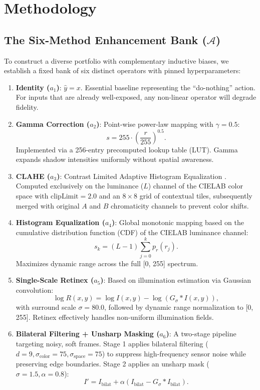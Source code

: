 \documentclass[journal]{IEEEtran}
\begin{document}
\section{Methodology}

\subsection{The Six-Method Enhancement Bank (\texorpdfstring{$\mathcal{A}$}{A})}
To construct a diverse portfolio with complementary inductive biases, we establish a fixed bank of six distinct operators with pinned hyperparameters:

\begin{enumerate}
    \item \textbf{Identity ($a_1$)}: $\hat{y} = x$. Essential baseline representing the ``do-nothing'' action. For inputs that are already well-exposed, any non-linear operator will degrade fidelity.
    \item \textbf{Gamma Correction ($a_2$)}: Point-wise power-law mapping with $\gamma = 0.5$:
    \begin{equation}
    s = 255 \cdot \left(\frac{r}{255}\right)^{0.5}.
    \end{equation}
    Implemented via a 256-entry precomputed lookup table (LUT). Gamma expands shadow intensities uniformly without spatial awareness.
    \item \textbf{CLAHE ($a_3$)}: Contrast Limited Adaptive Histogram Equalization \cite{zuiderveld1994contrast}. Computed exclusively on the luminance ($L$) channel of the CIELAB color space with $\text{clipLimit} = 2.0$ and an $8 \times 8$ grid of contextual tiles, subsequently merged with original $A$ and $B$ chromaticity channels to prevent color shifts.
    \item \textbf{Histogram Equalization ($a_4$)}: Global monotonic mapping based on the cumulative distribution function (CDF) of the CIELAB luminance channel:
    \begin{equation}
    s_k = (L - 1) \sum_{j=0}^k p_r(r_j).
    \end{equation}
    Maximizes dynamic range across the full [0, 255] spectrum.
    \item \textbf{Single-Scale Retinex ($a_5$)}: Based on illumination estimation via Gaussian convolution:
    \begin{equation}
    \log R(x, y) = \log I(x, y) - \log (G_\sigma * I(x, y)),
    \end{equation}
    with surround scale $\sigma = 80.0$, followed by dynamic range normalization to [0, 255]. Retinex effectively handles non-uniform illumination fields.
    \item \textbf{Bilateral Filtering + Unsharp Masking ($a_6$)}: A two-stage pipeline targeting noisy, soft frames. Stage 1 applies bilateral filtering ($d=9, \sigma_{\text{color}}=75, \sigma_{\text{space}}=75$) to suppress high-frequency sensor noise while preserving edge boundaries. Stage 2 applies an unsharp mask ($\sigma=1.5, \alpha=0.8$):
    \begin{equation}
    I' = I_{\text{bilat}} + \alpha (I_{\text{bilat}} - G_\sigma * I_{\text{bilat}}).
    \end{equation}
\end{enumerate}
\end{document}
